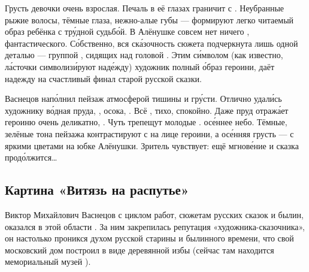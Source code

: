 Грусть девочки очень взрослая. Печаль в её глазах граничит с . Неубранные рыжие волосы, тёмные глаза, нежно-алые губы --- формируют легко читаемый образ ребёнка с тр\'{у}дной судьб\'{о}й.
В Алёнушке совсем нет ничего , фантастического.
С\'{о}бственно, вся ск\'{а}зочность сюжета подчеркнута лишь одной деталью --- группой , сидящих над головой . Этим с\'{и}мволом (как известно, л\'{а}сточки символиз\'{и}руют над\'{е}жду) художник  полный  \'{о}браз героини, даёт надежду на счастливый финал старой русской сказки.

Васнецов нап\'{о}лнил  пейзаж атмосферой тишины и гр\'{у}сти.
Отлично удал\'{и}сь художнику в\'{о}дная  пруда, , осока, .
Всё , тихо, спокойно.
Даже пруд отраж\'{а}ет героиню очень деликатно, .
Чуть трепещут молодые .   ос\'{е}ннее небо.
Тёмные, зелёные тона пейзажа контрастируют с  на лице героини, а ос\'{е}нняя грусть --- с яркими цветами на юбке Алёнушки. Зритель чувствует: ещё мгнов\'{е}ние и сказка прод\'{о}лжится\dots







\subsection{Картина «Витязь на распутье»}

Виктор Михайлович Васнецов с циклом работ,  сюжетам русских сказок и былин, оказался  в этой области . За ним закрепилась репутация «художника-сказочника», он настолько проникся духом русской старины и былинного времени, что свой московский дом построил в виде деревянной избы (сейчас там находится мемориальный музей ).



